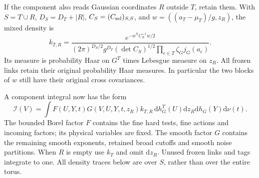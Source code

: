 \documentclass[11pt,reqno]{amsart}
\numberwithin{equation}{section}
\theoremstyle{definition}
\theoremstyle{remark}
\newcommand{\dd}{\mathrm d}
\begin{document}
If the component also reads Gaussian coordinates \(R\) outside
\(T\), retain them. With \(S=T\cup R\), \(D_S=D_T+|R|\),
\(C_S=(C_{\rm sel})_{S,S}\), and
\(w=((a_T-\mu_T)/g,z_R)\), the mixed density is
\begin{equation}
 k_{T,R}=
 \frac{e^{-w^{\mathsf T}C_S^{-1}w/2}}
 {(2\pi)^{D_S/2}g^{D_T}(\det C_S)^{1/2}
                     \prod_{e\in T}\zeta_Gj_G(a_e)}.
 \label{eq:output-mixed-density}
\end{equation}
Its measure is probability Haar on \(G^T\) times Lebesgue
measure on \(z_R\). All frozen links retain their original
probability Haar measures. In particular the two blocks of
\(w\) still have their original cross covariances.

A component integral now has the form
\begin{equation}
 \mathcal I(V)=\int F(U,Y,t)G(V,U,Y,t,z_R)k_{T,R}
               \,\dd h_G^T(U)\dd z_R\dd h_G(Y)\dd\nu(t).
 \label{eq:output-fixed-physical-integral}
\end{equation}
The bounded Borel factor \(F\) contains the fine hard tests,
fine actions and incoming factors; its physical variables are
fixed. The smooth factor \(G\) contains the remaining smooth
exponents, retained broad cutoffs and smooth noise partitions.
When \(R\) is empty use \(k_T\) and omit \(\dd z_R\).
Unused frozen links and tags integrate to one. All density
traces below are over \(S\), rather than over the entire torus.
\end{document}
